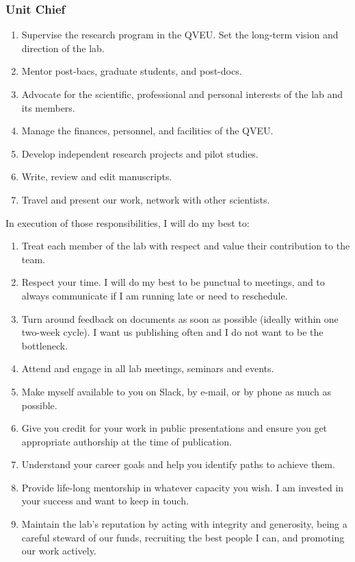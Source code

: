 \documentclass[10pt, letterpaper, twocolumn]{article} %
\begin{document}
\subsubsection{Unit Chief}
\begin{enumerate}
\item Supervise the research program in the QVEU. Set the long-term vision and direction of the lab.
\item Mentor post-bacs, graduate students, and post-docs.
\item Advocate for the scientific, professional and personal interests of the lab and its members.
\item Manage the finances, personnel, and facilities of the QVEU.
\item Develop independent research projects and pilot studies.
\item Write, review and edit manuscripts.
\item Travel and present our work, network with other scientists.
\end{enumerate}
In execution of those responsibilities, I will do my best to:
\begin{enumerate}
\item Treat each member of the lab with respect and value their contribution to the team.
\item Respect your time. I will do my best to be punctual to meetings, and to always communicate if I am running late or need to reschedule.
\item Turn around feedback on documents as soon as possible (ideally within one two-week cycle). I want us publishing often and I do not want to be the bottleneck.
\item Attend and engage in all lab meetings, seminars and events.
\item Make myself available to you on Slack, by e-mail, or by phone as much as possible.
\item Give you credit for your work in public presentations and ensure you get appropriate authorship at the time of publication.
\item Understand your career goals and help you identify paths to achieve them.
\item Provide life-long mentorship in whatever capacity you wish. I am invested in your success and want to keep in touch.
\item Maintain the lab's reputation by acting with integrity and generosity, being a careful steward of our funds, recruiting the best people I can, and promoting our work actively.
\end{enumerate}
\end{document}
